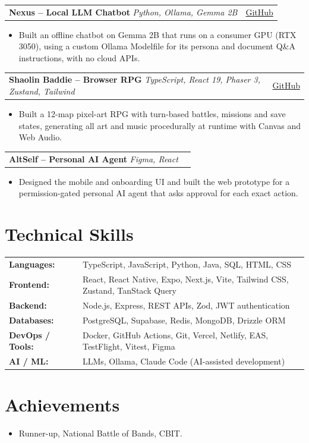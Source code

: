 \documentclass[a4paper,10pt]{article}
\makeatletter
\newcommand{\project}[3]{%
  \begin{tabularx}{\linewidth}{@{}X r@{}}
    \textbf{#1} \textbar{} \textit{#2} & #3 \\
  \end{tabularx}\vspace{-3pt}}
\makeatother
\begin{document}
\project{Nexus -- Local LLM Chatbot}{Python, Ollama, Gemma 2B}
        {\href{https://github.com/4bhimxnyu/Nexus-Local-LLM}{GitHub}}
\begin{itemize}
  \item Built an offline chatbot on Gemma 2B that runs on a consumer GPU (RTX 3050), using a custom Ollama Modelfile for its persona and document Q\&A instructions, with no cloud APIs.
\end{itemize}

\project{Shaolin Baddie -- Browser RPG}{TypeScript, React 19, Phaser 3, Zustand, Tailwind}
        {\href{https://github.com/4bhimxnyu/Pixel-Art-Adventure-Game.}{GitHub}}
\begin{itemize}
  \item Built a 12-map pixel-art RPG with turn-based battles, missions and save states, generating all art and music procedurally at runtime with Canvas and Web Audio.
\end{itemize}

\project{AltSelf -- Personal AI Agent}{Figma, React}{}
\begin{itemize}
  \item Designed the mobile and onboarding UI and built the web prototype for a permission-gated personal AI agent that asks approval for each exact action.
\end{itemize}

\section{Technical Skills}
\begin{tabularx}{\linewidth}{@{}l X@{}}
  \textbf{Languages:}~      & TypeScript, JavaScript, Python, Java, SQL, HTML, CSS \\
  \textbf{Frontend:}~       & React, React Native, Expo, Next.js, Vite, Tailwind CSS, Zustand, TanStack Query \\
  \textbf{Backend:}~        & Node.js, Express, REST APIs, Zod, JWT authentication \\
  \textbf{Databases:}~      & PostgreSQL, Supabase, Redis, MongoDB, Drizzle ORM \\
  \textbf{DevOps / Tools:}~ & Docker, GitHub Actions, Git, Vercel, Netlify, EAS, TestFlight, Vitest, Figma \\
  \textbf{AI / ML:}~        & LLMs, Ollama, Claude Code (AI-assisted development) \\
\end{tabularx}

\section{Achievements}
\begin{itemize}
  \item Runner-up, National Battle of Bands, CBIT.
\end{itemize}
\end{document}
